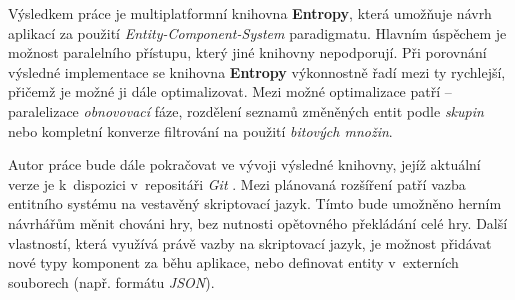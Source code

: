 

Výsledkem práce je multiplatformní knihovna \textbf{Entropy}, která umožňuje návrh aplikací za použití \emph{Entity-Component-System} paradigmatu. Hlavním úspěchem je možnost paralelního přístupu, který jiné knihovny nepodporují. Při porovnání výsledné implementace se knihovna \textbf{Entropy} výkonnostně řadí mezi ty rychlejší, přičemž je možné ji dále optimalizovat. Mezi možné optimalizace patří -- paralelizace \emph{obnovovací} fáze, rozdělení seznamů změněných entit podle \emph{skupin} nebo kompletní konverze filtrování na použití \emph{bitových množin}.

Autor práce bude dále pokračovat ve vývoji výsledné knihovny, jejíž aktuální verze je k~dispozici v~repositáři \emph{Git} \cite{EntropyGit}. Mezi plánovaná rozšíření patří vazba entitního systému na vestavěný skriptovací jazyk. Tímto bude umožněno herním návrhářům měnit chováni hry, bez nutnosti opětovného překládání celé hry. Další vlastností, která využívá právě vazby na skriptovací jazyk, je možnost přidávat nové typy komponent za běhu aplikace, nebo definovat entity v~externích souborech (např. formátu \emph{JSON}). 



